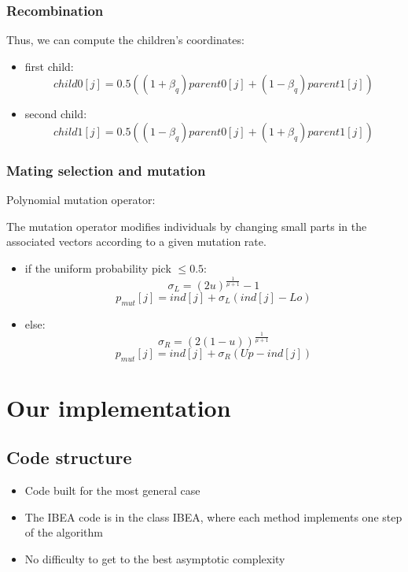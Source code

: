 \documentclass{beamer}
\begin{document}
\begin{frame}
\frametitle{Recombination}
Thus, we can compute the children's coordinates:

\begin{itemize}
\item first child:
\begin{equation}
child0[j] = 0.5((1+\beta_q)parent0[j]+(1-\beta_q)parent1[j])
\end{equation}
\item second child:
\begin{equation}
child1[j] = 0.5((1-\beta_q)parent0[j]+(1+\beta_q)parent1[j])
\end{equation}
\end{itemize}

\end{frame}

\begin{frame}
\frametitle{Mating selection and mutation}
Polynomial mutation operator:

The mutation operator modifies individuals by changing small parts in the associated vectors according to a given mutation rate.

\begin{itemize}
\item if the uniform probability pick $\leq 0.5$:
\begin{equation}
\sigma_L = (2u)^{\frac{1}{\mu +1}}-1 
\end{equation}
\begin{equation}
p_{mut}[j] = ind[j] + \sigma_L(ind[j]-Lo)
\end{equation}
\item else:
\begin{equation}
\sigma_R = (2(1-u))^{\frac{1}{\mu +1}} 
\end{equation}
\begin{equation}
p_{mut}[j] = ind[j] + \sigma_R(Up-ind[j])
\end{equation}
\end{itemize}

\end{frame}

\section{Our implementation}
\subsection{Code structure}
\begin{frame}
\begin{itemize}
\item Code built for the most general case
\item The IBEA code is in the class IBEA, where each method implements one step of the algorithm
\item No difficulty to get to the best asymptotic complexity
\end{itemize}
\end{frame}
\end{document}
